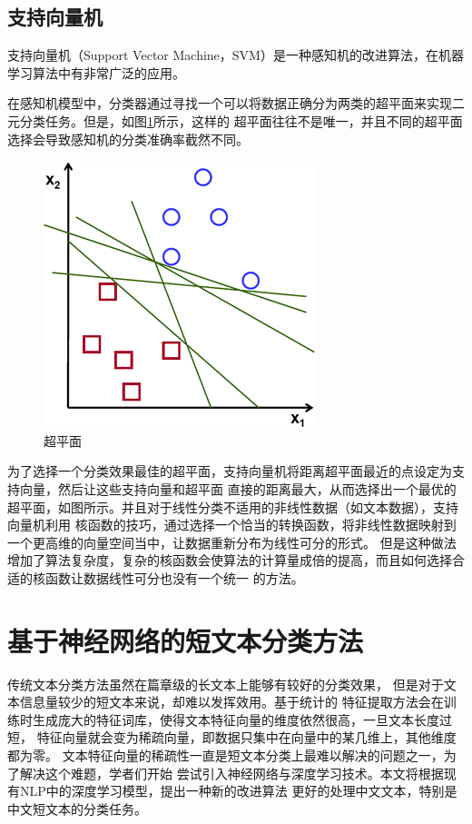 \subsection{支持向量机}
支持向量机（Support Vector Machine，SVM）是一种感知机的改进算法，在机器学习算法中有非常广泛的应用。

在感知机模型中，分类器通过寻找一个可以将数据正确分为两类的超平面来实现二元分类任务。但是，如图\ref{separating_lines}所示，这样的
超平面往往不是唯一，并且不同的超平面选择会导致感知机的分类准确率截然不同。
\begin{figure}[h]
    \includegraphics[scale=3]{picture/separating-lines.png}
    \caption{超平面}
    \label{separating_lines}
\end{figure}

为了选择一个分类效果最佳的超平面，支持向量机将距离超平面最近的点设定为支持向量，然后让这些支持向量和超平面
直接的距离最大，从而选择出一个最优的超平面，如图所示。并且对于线性分类不适用的非线性数据（如文本数据），支持向量机利用
核函数的技巧，通过选择一个恰当的转换函数，将非线性数据映射到一个更高维的向量空间当中，让数据重新分布为线性可分的形式。
但是这种做法增加了算法复杂度，复杂的核函数会使算法的计算量成倍的提高，而且如何选择合适的核函数让数据线性可分也没有一个统一
的方法。

\section{基于神经网络的短文本分类方法}
传统文本分类方法虽然在篇章级的长文本上能够有较好的分类效果，
但是对于文本信息量较少的短文本来说，却难以发挥效用。基于统计的
特征提取方法会在训练时生成庞大的特征词库，使得文本特征向量的维度依然很高，一旦文本长度过短，
特征向量就会变为稀疏向量，即数据只集中在向量中的某几维上，其他维度都为零。
文本特征向量的稀疏性一直是短文本分类上最难以解决的问题之一，为了解决这个难题，学者们开始
尝试引入神经网络与深度学习技术。本文将根据现有NLP中的深度学习模型，提出一种新的改进算法
更好的处理中文文本，特别是中文短文本的分类任务。

